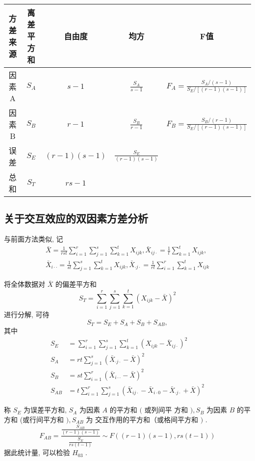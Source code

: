 \begin{table}
   \begin{tabular}{c|c|c|c|c}
    \hline
            方差来源 & 离差平方和 & 自由度 & 均方 & F值 \\
    \hline 因素 A & \( S_{A} \) & \( s-1 \) & \( \frac{S_{A}}{s-1} \) & \( F_{A}=\frac{S_{A} /(s-1)}{S_{E} /[(r-1)(s-1)]} \) \\
    \hline  因素 B & \( S_{B} \) & \( r-1 \) & \( \frac{S_{B}}{r-1} \) & \( F_{B}=\frac{S_{B} /(r-1)}{S_{E} /[(r-1)(s-1)]} \) \\
    \hline 误 差 & \( S_{E} \) & \( (r-1)(s-1) \) & \( \frac{S_{E}}{(r-1)(s-1)} \) & \\
    \hline 总 和 & \( {S}_{T} \) & \( {r s}-{1} \) & & \\
    \hline
    \end{tabular} 
\end{table}

\subsection{关于交互效应的双因素方差分析}

与前面方法类似, 记
$$
\begin{array}{l}
\bar{X}=\frac{1}{r s t} \sum_{i=1}^{r} \sum_{j=1}^{s} \sum_{k=1}^{t} X_{i j k}, \bar{X}_{i j \cdot}=\frac{1}{t} \sum_{k=1}^{t} X_{i j k}, \\
\bar{X}_{i \cdot \cdot}=\frac{1}{s t} \sum_{j=1}^{s} \sum_{k=1}^{t} X_{i j k}, \bar{X}_{\cdot j \cdot}=\frac{1}{r t} \sum_{i=1}^{r} \sum_{k=1}^{t} X_{i j k}
\end{array}
$$

将全体数据对 \( \bar{X} \) 的偏差平方和
$$
S_{T}=\sum_{i=1}^{r} \sum_{j=1}^{s} \sum_{k=1}^{t}\left(X_{i j k}-\bar{X}\right)^{2}
$$
进行分解, 可待
$$
S_{T}=S_{E}+S_{A}+S_{B}+S_{A B},
$$
其中
$$
\begin{aligned}
S_{E} &=\sum_{i=1}^{r} \sum_{j=1}^{s} \sum_{k=1}^{t}\left(X_{i j k}-\bar{X}_{i j \cdot}\right)^{2} \\
S_{A} &=r t \sum_{j=1}^{s}\left(\bar{X}_{\cdot j \cdot}-\bar{X}\right)^{2} \\
S_{B} &=s t \sum_{i=1}^{r}\left(\bar{X}_{i \cdot \cdot}-\bar{X}\right)^{2} \\
S_{A B} &=t \sum_{i=1}^{r} \sum_{j=1}^{s}\left(\bar{X}_{i j \cdot}-\bar{X}_{i \cdot 0}-\bar{X}_{\cdot j \cdot}+\bar{X}\right)^{2}
\end{aligned}
$$

称 \( S_{E} \) 为误差平方和,  \( {S}_{A} \) 为因素 \( {A} \) 的平方和 \( ( \) 或列间平 方和 \( ), S_{B} \) 为因素 \( B \) 的平方和 (或行间平方和 \( ), S_{A B} \) 为 交互作用的平方和（或格间平方和 \( ) \) . 
$$
F_{A B}=\frac{\frac{S_{A B}}{(r-1)(s-1)}}{\frac{S_{E}}{r s(t-1)}} \sim F((r-1)(s-1), r s(t-1))
$$
据此统计量, 可以检验 \( {H}_{03} \) . 


